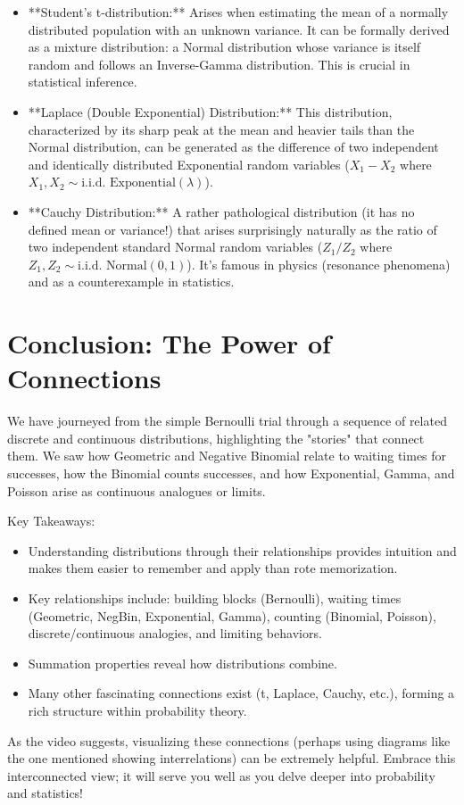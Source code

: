 \documentclass[11pt, letterpaper]{article}
\theoremstyle{definition}
\theoremstyle{remark}
\begin{document}
\begin{itemize}
    \item **Student's t-distribution:** Arises when estimating the mean of a normally distributed population with an unknown variance. It can be formally derived as a mixture distribution: a Normal distribution whose variance is itself random and follows an Inverse-Gamma distribution. This is crucial in statistical inference.
    \item **Laplace (Double Exponential) Distribution:** This distribution, characterized by its sharp peak at the mean and heavier tails than the Normal distribution, can be generated as the difference of two independent and identically distributed Exponential random variables ($X_1 - X_2$ where $X_1, X_2 \sim \text{i.i.d. Exponential}(\lambda)$).
    \item **Cauchy Distribution:** A rather pathological distribution (it has no defined mean or variance!) that arises surprisingly naturally as the ratio of two independent standard Normal random variables ($Z_1 / Z_2$ where $Z_1, Z_2 \sim \text{i.i.d. Normal}(0, 1)$). It's famous in physics (resonance phenomena) and as a counterexample in statistics.
\end{itemize}

\section{Conclusion: The Power of Connections}

We have journeyed from the simple Bernoulli trial through a sequence of related discrete and continuous distributions, highlighting the "stories" that connect them. We saw how Geometric and Negative Binomial relate to waiting times for successes, how the Binomial counts successes, and how Exponential, Gamma, and Poisson arise as continuous analogues or limits.

Key Takeaways:
\begin{itemize}
    \item Understanding distributions through their relationships provides intuition and makes them easier to remember and apply than rote memorization.
    \item Key relationships include: building blocks (Bernoulli), waiting times (Geometric, NegBin, Exponential, Gamma), counting (Binomial, Poisson), discrete/continuous analogies, and limiting behaviors.
    \item Summation properties reveal how distributions combine.
    \item Many other fascinating connections exist (t, Laplace, Cauchy, etc.), forming a rich structure within probability theory.
\end{itemize}

As the video suggests, visualizing these connections (perhaps using diagrams like the one mentioned showing interrelations) can be extremely helpful. Embrace this interconnected view; it will serve you well as you delve deeper into probability and statistics!
\end{document}
